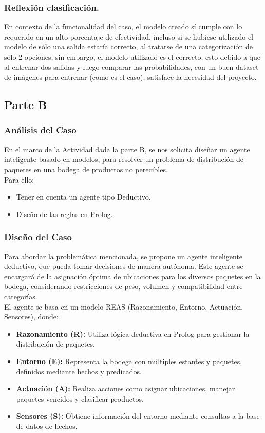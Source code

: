 \documentclass[12pt]{article}
\begin{document}
\subsubsection{Reflexión clasificación.}
En contexto de la funcionalidad del caso, el modelo creado sí cumple con lo requerido en un alto porcentaje de efectividad, incluso si se hubiese utilizado el modelo de sólo una salida estaría correcto, al tratarse de una categorización de sólo 2 opciones, sin embargo, el modelo utilizado es el correcto, esto debido a que al entrenar dos salidas y luego comparar las probabilidades, con un buen dataset de imágenes para entrenar (como es el caso), satisface la necesidad del proyecto.

\subsection{Parte B}

\subsubsection{Análisis del Caso}
En el marco de la Actividad dada la parte B, se nos solicita diseñar un agente inteligente basado en modelos, para resolver un problema de distribución de paquetes en una bodega de productos no perecibles.\\
Para ello:
\begin{itemize}
    \item Tener en cuenta un agente tipo Deductivo.
    \item Diseño de las reglas en Prolog.
\end{itemize}

\subsubsection{Diseño del Caso}

Para abordar la problemática mencionada, se propone un agente inteligente deductivo, que pueda tomar decisiones de manera autónoma. Este agente se encargará de la asignación óptima de ubicaciones para los diversos paquetes en la bodega, considerando restricciones de peso, volumen y compatibilidad entre categorías.\\
El agente se basa en un modelo REAS (Razonamiento, Entorno, Actuación, Sensores), donde:
\begin{itemize}
    \item \textbf{Razonamiento (R):} Utiliza lógica deductiva en Prolog para gestionar la distribución de paquetes.
    \item \textbf{Entorno (E):} Representa la bodega con múltiples estantes y paquetes, definidos mediante hechos y predicados.
    \item \textbf{Actuación (A):} Realiza acciones como asignar ubicaciones, manejar paquetes vencidos y clasificar productos.
    \item \textbf{Sensores (S):} Obtiene información del entorno mediante consultas a la base de datos de hechos.
\end{itemize}
\end{document}
